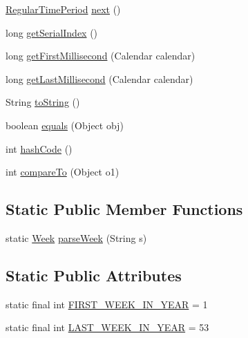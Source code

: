 \begin{DoxyCompactItemize}
\item 
\mbox{\hyperlink{classorg_1_1jfree_1_1data_1_1time_1_1_regular_time_period}{Regular\+Time\+Period}} \mbox{\hyperlink{classorg_1_1jfree_1_1data_1_1time_1_1_week_a5ef982a5aa1fd1e16ee6dd03aa2a57e8}{next}} ()
\item 
long \mbox{\hyperlink{classorg_1_1jfree_1_1data_1_1time_1_1_week_a6e3470783df9ec508c4948f53209559f}{get\+Serial\+Index}} ()
\item 
long \mbox{\hyperlink{classorg_1_1jfree_1_1data_1_1time_1_1_week_a6f48f84f8c5fab500c6b9c89ccbaae39}{get\+First\+Millisecond}} (Calendar calendar)
\item 
long \mbox{\hyperlink{classorg_1_1jfree_1_1data_1_1time_1_1_week_ac4aafbde4298deacd05e26f795af5f41}{get\+Last\+Millisecond}} (Calendar calendar)
\item 
String \mbox{\hyperlink{classorg_1_1jfree_1_1data_1_1time_1_1_week_af414f72d4a4e6edd490c0da3e6d4719a}{to\+String}} ()
\item 
boolean \mbox{\hyperlink{classorg_1_1jfree_1_1data_1_1time_1_1_week_a578ca4171ac54341c0590dbd544e8294}{equals}} (Object obj)
\item 
int \mbox{\hyperlink{classorg_1_1jfree_1_1data_1_1time_1_1_week_a9711eb24ca8c476e444c3e05d5ca3c15}{hash\+Code}} ()
\item 
int \mbox{\hyperlink{classorg_1_1jfree_1_1data_1_1time_1_1_week_aff8d1c44610cb69ff6f1ea4075c8faad}{compare\+To}} (Object o1)
\end{DoxyCompactItemize}
\subsection*{Static Public Member Functions}
\begin{DoxyCompactItemize}
\item 
static \mbox{\hyperlink{classorg_1_1jfree_1_1data_1_1time_1_1_week}{Week}} \mbox{\hyperlink{classorg_1_1jfree_1_1data_1_1time_1_1_week_aaea87c2280ded91989c8dd73a0bdf912}{parse\+Week}} (String s)
\end{DoxyCompactItemize}
\subsection*{Static Public Attributes}
\begin{DoxyCompactItemize}
\item 
static final int \mbox{\hyperlink{classorg_1_1jfree_1_1data_1_1time_1_1_week_a4bf0ee927fde0f700b2ca12ae78ab93f}{F\+I\+R\+S\+T\+\_\+\+W\+E\+E\+K\+\_\+\+I\+N\+\_\+\+Y\+E\+AR}} = 1
\item 
static final int \mbox{\hyperlink{classorg_1_1jfree_1_1data_1_1time_1_1_week_a3c468be77dbf7b123d0f38e232ca8b12}{L\+A\+S\+T\+\_\+\+W\+E\+E\+K\+\_\+\+I\+N\+\_\+\+Y\+E\+AR}} = 53
\end{DoxyCompactItemize}



